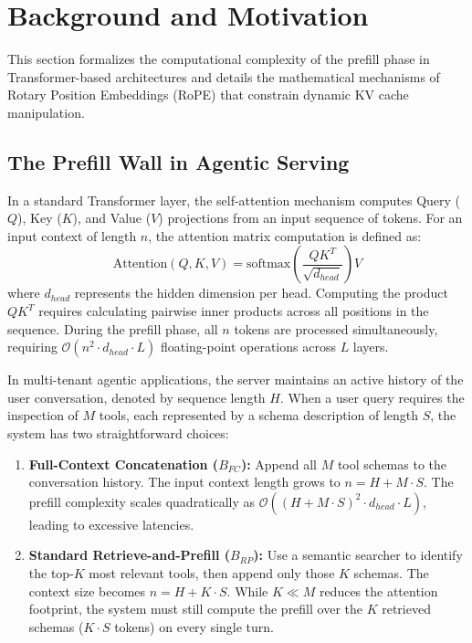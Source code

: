 \section{Background and Motivation}
\label{sec:background}

This section formalizes the computational complexity of the prefill phase in Transformer-based architectures and details the mathematical mechanisms of Rotary Position Embeddings (RoPE) that constrain dynamic KV cache manipulation.

\subsection{The Prefill Wall in Agentic Serving}
In a standard Transformer layer, the self-attention mechanism computes Query ($Q$), Key ($K$), and Value ($V$) projections from an input sequence of tokens. For an input context of length $n$, the attention matrix computation is defined as:
\begin{equation}
\text{Attention}(Q, K, V) = \text{softmax}\left(\frac{QK^T}{\sqrt{d_{head}}}\right)V
\end{equation}
where $d_{head}$ represents the hidden dimension per head. Computing the product $Q K^T$ requires calculating pairwise inner products across all positions in the sequence. During the prefill phase, all $n$ tokens are processed simultaneously, requiring $\mathcal{O}(n^2 \cdot d_{head} \cdot L)$ floating-point operations across $L$ layers.

In multi-tenant agentic applications, the server maintains an active history of the user conversation, denoted by sequence length $H$. When a user query requires the inspection of $M$ tools, each represented by a schema description of length $S$, the system has two straightforward choices:
\begin{enumerate}
  \item \textbf{Full-Context Concatenation ($B_{FC}$):} Append all $M$ tool schemas to the conversation history. The input context length grows to $n = H + M \cdot S$. The prefill complexity scales quadratically as $\mathcal{O}((H + M \cdot S)^2 \cdot d_{head} \cdot L)$, leading to excessive latencies.
  \item \textbf{Standard Retrieve-and-Prefill ($B_{RP}$):} Use a semantic searcher to identify the top-$K$ most relevant tools, then append only those $K$ schemas. The context size becomes $n = H + K \cdot S$. While $K \ll M$ reduces the attention footprint, the system must still compute the prefill over the $K$ retrieved schemas ($K \cdot S$ tokens) on every single turn.
\end{enumerate}

